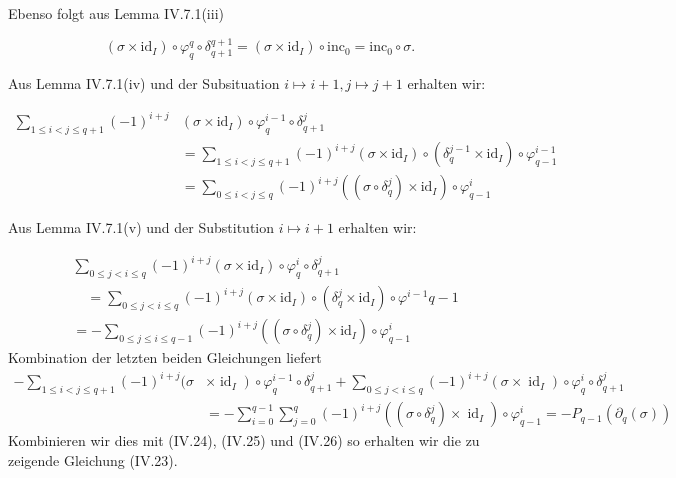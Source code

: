 \documentclass[10pt, letterpaper]{article}
\begin{document}
Ebenso folgt aus Lemma IV.7.1(iii)

$$
\left(\sigma \times \mathrm{id}_I\right) \circ \varphi_q^q \circ \delta_{q+1}^{q+1}=\left(\sigma \times \mathrm{id}_I\right) \circ \mathrm{inc}_0=\mathrm{inc}_0 \circ \sigma .
$$


Aus Lemma IV.7.1(iv) und der Subsituation $i \mapsto i+1, j \mapsto j+1$ erhalten wir:

$$
\begin{aligned}
\sum_{1 \leq i<j \leq q+1}(-1)^{i+j} & \left(\sigma \times \mathrm{id}_I\right) \circ \varphi_q^{i-1} \circ \delta_{q+1}^j \\
& =\sum_{1 \leq i<j \leq q+1}(-1)^{i+j}\left(\sigma \times \mathrm{id}_I\right) \circ\left(\delta_q^{j-1} \times \mathrm{id}_I\right) \circ \varphi_{q-1}^{i-1} \\
& =\sum_{0 \leq i<j \leq q}(-1)^{i+j}\left(\left(\sigma \circ \delta_q^j\right) \times \mathrm{id}_I\right) \circ \varphi_{q-1}^i
\end{aligned}
$$

Aus Lemma IV.7.1(v) und der Substitution $i \mapsto i+1$ erhalten wir:

$$
\begin{aligned}
& \sum_{0 \leq j<i \leq q}(-1)^{i+j}\left(\sigma \times \mathrm{id}_I\right) \circ \varphi_q^i \circ \delta_{q+1}^j \\
& \quad=\sum_{0 \leq j<i \leq q}(-1)^{i+j}\left(\sigma \times \mathrm{id}_I\right) \circ\left(\delta_q^j \times \mathrm{id}_I\right) \circ \varphi^{i-1} q-1 \\
&=-\sum_{0 \leq j \leq i \leq q-1}(-1)^{i+j}\left(\left(\sigma \circ \delta_q^j\right) \times \mathrm{id}_I\right) \circ \varphi_{q-1}^i
\end{aligned}
$$
Kombination der letzten beiden Gleichungen liefert
$$
\begin{aligned}
-\sum_{1 \leq i<j \leq q+1}(-1)^{i+j}(\sigma & \left.\times \operatorname{id}_I\right) \circ \varphi_q^{i-1} \circ \delta_{q+1}^j+\sum_{0 \leq j<i \leq q}(-1)^{i+j}\left(\sigma \times \operatorname{id}_I\right) \circ \varphi_q^i \circ \delta_{q+1}^j \\
& =-\sum_{i=0}^{q-1} \sum_{j=0}^q(-1)^{i+j}\left(\left(\sigma \circ \delta_q^j\right) \times \operatorname{id}_I\right) \circ \varphi_{q-1}^i=-P_{q-1}\left(\partial_q(\sigma)\right)
\end{aligned}
$$
Kombinieren wir dies mit (IV.24), (IV.25) und (IV.26) so erhalten wir die zu zeigende Gleichung (IV.23).
\end{document}
